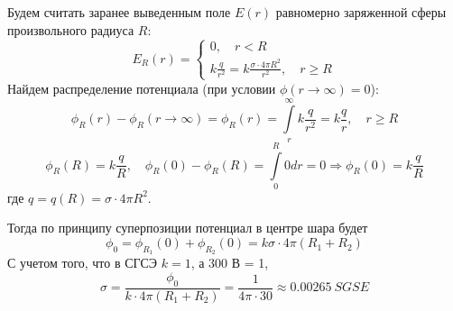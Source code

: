 \documentclass[a5paper,10pt]{article}\usepackage[usenames,dvipsnames]{color}\usepackage{extsizes,cmap,graphicx,misccorr,indentfirst,makecell,multirow,ulem,geometry,amssymb,amsfonts,amsmath,amsthm,titlesec,float,fancyhdr,wrapfig,tikz}\usepackage[T2A]{fontenc}\usepackage[utf8x]{inputenc}\usepackage[english, russian]{babel}\usetikzlibrary{decorations.pathreplacing,decorations.pathmorphing,patterns,calc,scopes,arrows,through,positioning,shapes.misc}\graphicspath{{img/}}\linespread{1.3}\frenchspacing\geometry{left=1cm, right=1cm, top=2cm, bottom=1cm, bindingoffset=0cm}\pagestyle{fancy}\fancyhead{}\fancyhead[R]{Сарафанов Ф.Г.}
\newcommand{\lineann}[4][0.5]{%
    \begin{scope}[rotate=#2, blue,inner sep=2pt]
        \draw[dashed, blue!40] (0,0) -- +(0,#1)
            node [coordinate, near end] (a) {};
        \draw[dashed, blue!40] (#3,0) -- +(0,#1)
            node [coordinate, near end] (b) {};
        \draw[|<->|] (a) -- node[fill=white] {#4} (b);
    \end{scope}
}
\begin{document}
\begin{figure}[H]
    \centering
\end{figure}
Будем считать заранее выведенным поле $E(r)$ равномерно заряженной сферы произвольного радиуса $R$:
\begin{equation}
    E_R(r)=\left\{
    \begin{aligned}
        0, \quad r<R\\
        k\frac{q}{r^2}=k\frac{\sigma\cdot4\pi R^2}{r^2}, \quad r\geq R
    \end{aligned}
    \right.
\end{equation}
Найдем распределение потенциала  (при условии $\phi(r\to\infty)=0$):
\begin{equation}
    \phi_R(r)-\phi_R(r\to\infty)=\phi_R(r)=
    \int\limits_r^\infty k\frac{q}{r^2}=k\frac{q}{r}, \quad r\ge R
\end{equation}
\begin{equation}
    \phi_R(R)=k\frac{q}{R}, \quad \phi_R(0)-\phi_R(R)=\int\limits_0^R 0 dr=0 \Rightarrow \phi_R(0)=k\frac{q}{R}
\end{equation}
где $q=q(R)=\sigma\cdot 4\pi R^2$.

Тогда по принципу суперпозиции потенциал в центре шара будет
\begin{equation}
    \phi_0=\phi_{R_1}(0)+\phi_{R_2}(0)=k\sigma\cdot4\pi (R_1+R_2)
\end{equation}
С учетом того, что в СГСЭ $k=1$, а 300 В = 1, 
\begin{equation}
    \sigma=\frac{\phi_0}{k\cdot4\pi (R_1+R_2)}=\frac{1}{4\pi\cdot 30}\approx0.00265\ SGSE
\end{equation}
\end{document}
